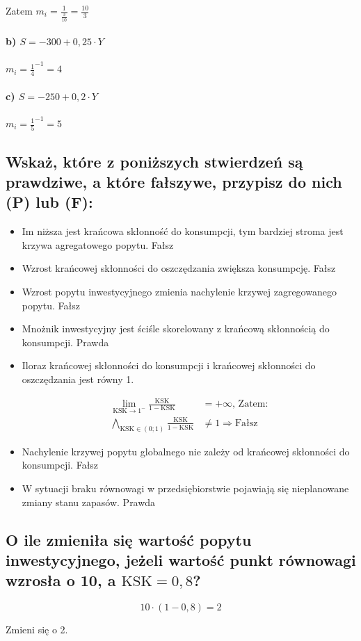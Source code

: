 \documentclass[a4paper,12pt]{article}
\begin{document}
Zatem $m_i = \frac{1}{\frac{3}{10}} = \frac{10}{3}$
\paragraph*{b) $S = -300 + 0,25\cdot Y$}
$m_i = \frac{1}{4}^{-1} = 4$

\paragraph*{c) $S = -250 + 0,2\cdot Y$}

$m_i = \frac{1}{5}^{-1} = 5$

\subsection{Wskaż, które z poniższych stwierdzeń są prawdziwe, a które fałszywe, przypisz do nich (P) lub (F):}

\begin{itemize}
	\item Im niższa jest krańcowa skłonność do konsumpcji, tym bardziej stroma jest krzywa agregatowego popytu. Fałsz
	\item Wzrost krańcowej skłonności do oszczędzania zwiększa konsumpcję. Fałsz
	\item Wzrost popytu inwestycyjnego zmienia nachylenie krzywej zagregowanego popytu. Fałsz
	\item Mnożnik inwestycyjny jest ściśle skorelowany z krańcową skłonnością do konsumpcji. Prawda

	\item Iloraz krańcowej skłonności do konsumpcji i krańcowej skłonności do oszczędzania jest równy 1.

	      \begin{align*}
		      \lim_{\text{KSK}\rightarrow 1^{-}} \frac{\text{KSK}}{1 - \text{KSK}}          & = +\infty \text{, Zatem:}         \\
		      \bigwedge_{\text{KSK} \in \left(0; 1\right)}\frac{\text{KSK}}{1 - \text{KSK}} & \not = 1 \Rightarrow \text{Fałsz}
	      \end{align*}

	\item Nachylenie krzywej popytu globalnego nie zależy od krańcowej skłonności do konsumpcji. Fałsz
	\item W sytuacji braku równowagi w przedsiębiorstwie pojawiają się nieplanowane zmiany stanu zapasów. Prawda
\end{itemize}

\subsection{O ile zmieniła się wartość popytu inwestycyjnego, jeżeli wartość punkt równowagi wzrosła o 10, a $\text{KSK} = 0,8$?}

\[10 \cdot \left(1 - 0,8\right) = 2\]

Zmieni się o 2.
\end{document}
